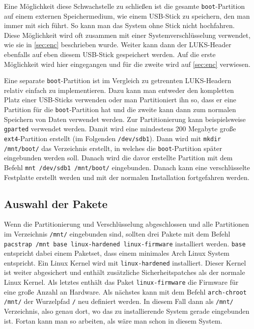 Eine Möglichkeit diese Schwachstelle zu schließen ist die gesamte \texttt{boot}-Partition auf einem externen Speichermedium, wie einem USB-Stick zu speichern, den man immer mit sich führt. So kann man das System ohne Stick nicht hochfahren. Diese Möglichkeit wird oft zusammen mit einer Systemverschlüsselung verwendet, wie sie in \autoref{sec:enc} beschrieben wurde. Weiter kann dann der \ac{LUKS}-Header ebenfalls auf eben diesem USB-Stick gespeichert werden.\cite{SecurityArchWiki} Auf die erste Möglichkeit wird hier eingegangen und für die zweite wird auf \autoref{sec:enc} verwiesen.

Eine separate \texttt{boot}-Partition ist im Vergleich zu getrennten \ac{LUKS}-Headern relativ einfach zu implementieren. Dazu kann man entweder den kompletten Platz einer USB-Sticks verwenden oder man Partitioniert ihn so, dass er eine Partition für die \texttt{boot}-Partition hat und die zweite kann dann zum normalen Speichern von Daten verwendet werden. Zur Partitionierung kann beispielsweise \texttt{gparted} verwendet werden. Damit wird eine mindestens 200 Megabyte große \texttt{ext4}-Partition erstellt {\small(im Folgenden \texttt{/dev/sdb1})}. Dann wird mit \texttt{mkdir /mnt/boot/} das Verzeichnis erstellt, in welches die \texttt{boot}-Partition später eingebunden werden soll. Danach wird die davor erstellte Partition mit dem Befehl \texttt{mnt /dev/sdb1 /mnt/boot/} eingebunden. Danach kann eine verschlüsselte Festplatte erstellt werden und mit der normalen Installation fortgefahren werden.

\subsection{Auswahl der Pakete}
Wenn die Partitionierung und Verschlüsselung abgeschlossen und alle Partitionen im Verzeichnis \texttt{/mnt/} eingebunden sind, sollten drei Pakete mit dem Befehl \texttt{pacstrap /mnt base linux-hardened linux-firmware} installiert werden.\cite{InstallationGuideArchWiki} \texttt{base} entspricht dabei einem Paketset, dass einem minimales Arch Linux System entspricht. Ein Linux Kernel wird mit \texttt{linux-hardened} installiert. Dieser Kernel ist weiter abgesichert und enthält zusätzliche Sicherheitspatches als der normale Linux Kernel.\cite{SecurityArchWiki} Als letztes enthält das Paket \texttt{linux-firmware} die Firmware für eine große Anzahl an Hardware. Als nächstes kann mit dem Befehl \texttt{arch-chroot /mnt/} der Wurzelpfad \texttt{/} neu definiert werden.\cite{InstallationGuideArchWiki} In diesem Fall dann als \texttt{/mnt/} Verzeichnis, also genau dort, wo das zu installierende System gerade eingebunden ist. Fortan kann man so arbeiten, als wäre man schon in diesem System.

